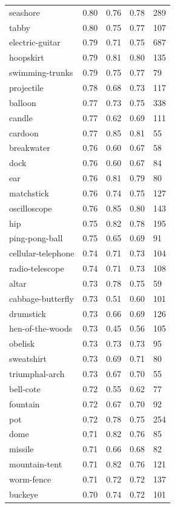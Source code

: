 \begin{center}
\begin{longtable}{lllll}
seashore & 0.80 & 0.76 & 0.78 & 289 \\
tabby & 0.80 & 0.75 & 0.77 & 107 \\
electric-guitar & 0.79 & 0.71 & 0.75 & 687 \\
hoopskirt & 0.79 & 0.81 & 0.80 & 135 \\
swimming-trunks & 0.79 & 0.75 & 0.77 & 79 \\
projectile & 0.78 & 0.68 & 0.73 & 117 \\
balloon & 0.77 & 0.73 & 0.75 & 338 \\
candle & 0.77 & 0.62 & 0.69 & 111 \\
cardoon & 0.77 & 0.85 & 0.81 & 55 \\
breakwater & 0.76 & 0.60 & 0.67 & 58 \\
dock & 0.76 & 0.60 & 0.67 & 84 \\
ear & 0.76 & 0.81 & 0.79 & 80 \\
matchstick & 0.76 & 0.74 & 0.75 & 127 \\
oscilloscope & 0.76 & 0.85 & 0.80 & 143 \\
hip & 0.75 & 0.82 & 0.78 & 195 \\
ping-pong-ball & 0.75 & 0.65 & 0.69 & 91 \\
cellular-telephone & 0.74 & 0.71 & 0.73 & 104 \\
radio-telescope & 0.74 & 0.71 & 0.73 & 108 \\
altar & 0.73 & 0.78 & 0.75 & 59 \\
cabbage-butterfly & 0.73 & 0.51 & 0.60 & 101 \\
drumstick & 0.73 & 0.66 & 0.69 & 126 \\
hen-of-the-woods & 0.73 & 0.45 & 0.56 & 105 \\
obelisk & 0.73 & 0.73 & 0.73 & 95 \\
sweatshirt & 0.73 & 0.69 & 0.71 & 80 \\
triumphal-arch & 0.73 & 0.67 & 0.70 & 55 \\
bell-cote & 0.72 & 0.55 & 0.62 & 77 \\
fountain & 0.72 & 0.67 & 0.70 & 92 \\
pot & 0.72 & 0.78 & 0.75 & 254 \\
dome & 0.71 & 0.82 & 0.76 & 85 \\
missile & 0.71 & 0.66 & 0.68 & 82 \\
mountain-tent & 0.71 & 0.82 & 0.76 & 121 \\
worm-fence & 0.71 & 0.72 & 0.72 & 137 \\
buckeye & 0.70 & 0.74 & 0.72 & 101 \\

\end{longtable}
\end{center}
